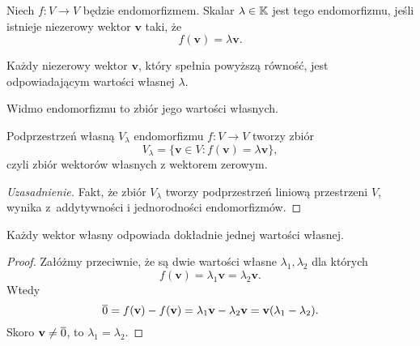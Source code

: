 \begin{definition}
    Niech $f : V \to V$ będzie endomorfizmem. Skalar $\lambda \in \mathbb K$ jest  tego endomorfizmu, jeśli istnieje niezerowy wektor $\mathbf{v}$ taki, że
    \[ f(\mathbf{v}) = \lambda\mathbf{v}. \]

    Każdy niezerowy wektor $\mathbf{v}$, który spełnia powyższą równość, jest  odpowiadającym wartości własnej $\lambda$.
\end{definition}

\begin{definition}
    Widmo endomorfizmu to zbiór jego wartości własnych.
\end{definition}

\begin{definition}
    Podprzestrzeń własną $V_\lambda$ endomorfizmu $f : V \to V$ tworzy zbiór
    \[ V_\lambda = \{\mathbf{v} \in V : f(\mathbf{v}) = \lambda\mathbf{v}\}, \]
    czyli zbiór wektorów własnych z wektorem zerowym.
\end{definition}
\begin{proof}[Uzasadnienie]
    Fakt, że zbiór $V_\lambda$ tworzy podprzestrzeń liniową przestrzeni $V$, wynika z~addytywności i jednorodności endomorfizmów.
\end{proof}

\begin{theorem}
    Każdy wektor własny odpowiada dokładnie jednej wartości własnej.
\end{theorem}
\begin{proof}
    Załóżmy przeciwnie, że są dwie wartości własne $\lambda_1, \lambda_2$ dla których
    \[ f(\mathbf{v}) = \lambda_1\mathbf{v} = \lambda_2\mathbf{v}. \]
    Wtedy
    \[ \overline{0} = f(\mathbf{v}) - f(\mathbf{v}) = \lambda_1\mathbf{v} - \lambda_2\mathbf{v} = \mathbf{v}(\lambda_1 - \lambda_2). \]
    Skoro $\mathbf{v} \neq \overline{0}$, to $\lambda_1 = \lambda_2$.
\end{proof}

